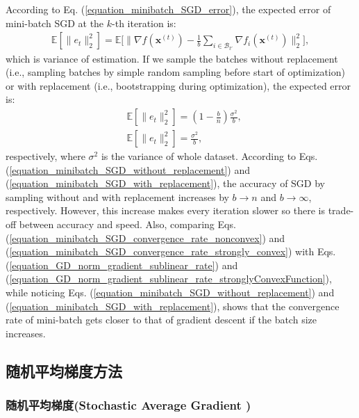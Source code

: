 \documentclass[lang=cn,10pt]{gorgeousnbook}
\numberwithin{equation}{section}%
\numberwithin{figure}{section}%
\begin{document}
According to Eq. (\ref{equation_minibatch_SGD_error}), the expected error of mini-batch SGD at the $k$-th iteration is:
\begin{align}\label{equation_minibatch_SGD_error_expectation}
\mathbb{E}[\|e_t\|_2^2] = \mathbb{E}\Big[\big\|\nabla f(\boldsymbol{x}^{(t)}) - \frac{1}{b} \sum_{i \in \mathcal{B}_{t'}} \nabla f_i(\boldsymbol{x}^{(t)})\big\|_2^2\Big],
\end{align}
which is variance of estimation. 
If we sample the batches without replacement (i.e., sampling batches by simple random sampling before start of optimization) or with replacement (i.e., bootstrapping during optimization), the expected error is:
\begin{align}
&\mathbb{E}[\|e_t\|_2^2] = (1 - \frac{b}{n}) \frac{\sigma^2}{b}, \label{equation_minibatch_SGD_without_replacement} \\
&\mathbb{E}[\|e_t\|_2^2] = \frac{\sigma^2}{b}, \label{equation_minibatch_SGD_with_replacement}
\end{align}
respectively, where $\sigma^2$ is the variance of whole dataset. 
According to Eqs. (\ref{equation_minibatch_SGD_without_replacement}) and (\ref{equation_minibatch_SGD_with_replacement}), the accuracy of SGD by sampling without and with replacement increases by $b \rightarrow n$ and $b \rightarrow \infty$, respectively. However, this increase makes every iteration slower so there is trade-off between accuracy and speed. 
Also, comparing Eqs. (\ref{equation_minibatch_SGD_convergence_rate_nonconvex}) and (\ref{equation_minibatch_SGD_convergence_rate_strongly_convex}) with Eqs. (\ref{equation_GD_norm_gradient_sublinear_rate}) and (\ref{equation_GD_norm_gradient_sublinear_rate_stronglyConvexFunction}), while noticing Eqs. (\ref{equation_minibatch_SGD_without_replacement}) and (\ref{equation_minibatch_SGD_with_replacement}), shows that the convergence rate of mini-batch gets closer to that of gradient descent if the batch size increases. 

\subsection{随机平均梯度方法}

\subsubsection{随机平均梯度(Stochastic Average Gradient )}
\end{document}
